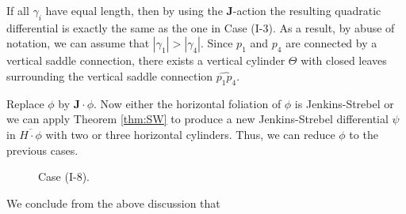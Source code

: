 \documentclass[11pt]{amsart}
\theoremstyle{plain}
\newcommand{\rot}{\mathbf{J}}
\begin{document}
 If all $\gamma_i$ have equal length, then by using the $\rot$-action the resulting quadratic differential
 is exactly the same as the one in Case (I-3). As a result, by abuse of notation,
  we can assume that $|\gamma_1|> |\gamma_4|$. Since $p_1$ and $p_4$ are connected by  a vertical saddle connection, there exists a vertical cylinder $\Theta$ with closed leaves 
 surrounding the  vertical saddle connection $\widehat{p_1p_4}$. 
 
 Replace $\phi$ by $\rot\cdot \phi$. 
 Now either the horizontal foliation of $\phi$ is Jenkins-Strebel or we can apply Theorem \ref{thm:SW} to produce a new Jenkins-Strebel differential $\psi$ in $\overline{H\cdot \phi}$ with two or three horizontal cylinders. Thus,  we can reduce $\phi$ to  the previous cases.
 



\begin{figure}[h]
    \centering
    \caption{ Case (I-8).}
    \label{fig:I-8}
\end{figure}










We conclude from the above discussion that
\end{document}
